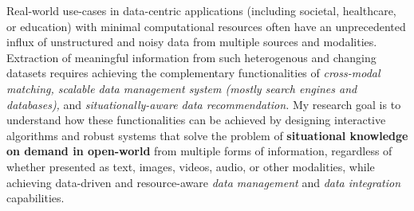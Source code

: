 
Real-world use-cases in data-centric applications 
(including societal, healthcare, or education) with minimal computational resources %
often have an unprecedented influx of unstructured and noisy data from multiple sources and modalities. 
Extraction of meaningful information %
from such 
heterogenous and changing %
datasets requires achieving the complementary 
functionalities of 
\textit{
cross-modal matching,
scalable data management system (mostly search engines and databases),
}and \textit{situationally-aware data recommendation.}
My research goal is to understand how these
functionalities can be achieved by %
designing interactive algorithms and 
robust systems %
that solve the problem of 
\textbf{situational knowledge on demand in open-world}
from multiple forms of information, regardless of whether
presented as text, images, videos, audio, or other modalities,
while achieving data-driven and resource-aware \textit{data management} and \textit{data integration} capabilities. 